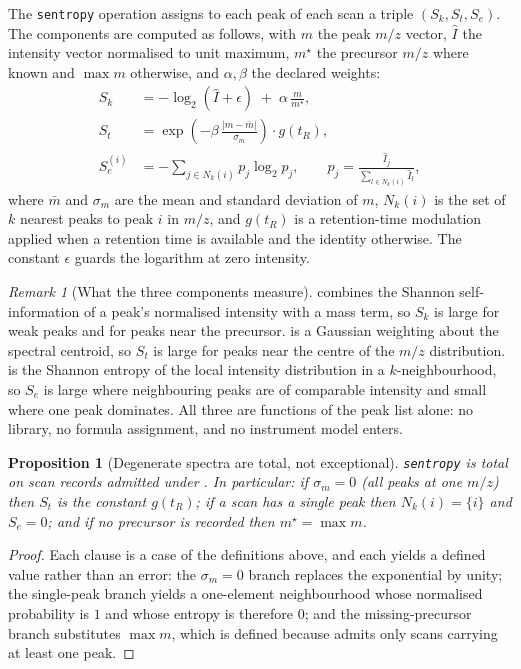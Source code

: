\documentclass[11pt,twocolumn,a4paper]{article}
\theoremstyle{ssthm}
\newtheorem{proposition}[theorem]{Proposition}
\theoremstyle{definition}
\theoremstyle{remark}
\newtheorem{remark}[theorem]{Remark}
\newcommand{\shk}[1]{\texttt{#1}}
\begin{document}
The \shk{sentropy} operation assigns to each peak of each scan a triple
$(S_k, S_t, S_e)$. The components are computed as follows, with $m$ the
peak $m/z$ vector, $\hat I$ the intensity vector normalised to unit
maximum, $m^{\star}$ the precursor $m/z$ where known and $\max m$
otherwise, and $\alpha,\beta$ the declared weights:
\begin{align}
S_k &= -\log_2(\hat I + \epsilon) \;+\; \alpha\,\frac{m}{m^{\star}},
      \label{eq:sk}\\[2pt]
S_t &= \exp\!\left(-\beta\,\frac{\lvert m-\bar m\rvert}{\sigma_m}\right)
       \cdot g(t_R),
      \label{eq:st}\\[2pt]
S_e^{(i)} &= -\!\!\sum_{j\in N_k(i)}\! p_j\log_2 p_j,
       \qquad p_j=\frac{\hat I_j}{\sum_{l\in N_k(i)}\hat I_l},
      \label{eq:se}
\end{align}
where $\bar m$ and $\sigma_m$ are the mean and standard deviation of $m$,
$N_k(i)$ is the set of $k$ nearest peaks to peak $i$ in $m/z$, and
$g(t_R)$ is a retention-time modulation applied when a retention time is
available and the identity otherwise. The constant $\epsilon$ guards the
logarithm at zero intensity.

\begin{remark}[What the three components measure]
\label{rem:components}
 combines the Shannon self-information of a peak's normalised
intensity with a mass term, so $S_k$ is large for weak peaks and for
peaks near the precursor.  is a Gaussian weighting about the
spectral centroid, so $S_t$ is large for peaks near the centre of the
$m/z$ distribution.  is the Shannon entropy of the local
intensity distribution in a $k$-neighbourhood, so $S_e$ is large where
neighbouring peaks are of comparable intensity and small where one peak
dominates. All three are functions of the peak list alone: no library, no
formula assignment, and no instrument model enters.
\end{remark}

\begin{proposition}[Degenerate spectra are total, not exceptional]
\label{prop:degenerate}
\shk{sentropy} is total on scan records admitted under .
In particular: if $\sigma_m=0$ (all peaks at one $m/z$) then $S_t$ is the
constant $g(t_R)$; if a scan has a single peak then $N_k(i)=\{i\}$ and
$S_e=0$; and if no precursor is recorded then $m^{\star}=\max m$.
\end{proposition}

\begin{proof}
Each clause is a case of the definitions above, and each yields a defined
value rather than an error: the $\sigma_m=0$ branch replaces the
exponential by unity; the single-peak branch yields a one-element
neighbourhood whose normalised probability is $1$ and whose entropy is
therefore $0$; and the missing-precursor branch substitutes $\max m$,
which is defined because  admits only scans carrying at
least one peak.
\end{proof}
\end{document}
